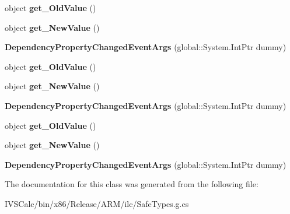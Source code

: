 \begin{DoxyCompactItemize}
object {\bfseries get\+\_\+\+Old\+Value} ()
\item 
\mbox{\label{class_windows_1_1_u_i_1_1_xaml_1_1_dependency_property_changed_event_args_a9f948d66a10d291f346697e57c1e5018}} 
object {\bfseries get\+\_\+\+New\+Value} ()
\item 
\mbox{\label{class_windows_1_1_u_i_1_1_xaml_1_1_dependency_property_changed_event_args_a74131a04ab6e85f2f133ed31ce9fb6b0}} 
{\bfseries Dependency\+Property\+Changed\+Event\+Args} (global\+::\+System.\+Int\+Ptr dummy)
\item 
\mbox{\label{class_windows_1_1_u_i_1_1_xaml_1_1_dependency_property_changed_event_args_ae4f18e2b5568671af10ff4232af56e6d}} 
object {\bfseries get\+\_\+\+Old\+Value} ()
\item 
\mbox{\label{class_windows_1_1_u_i_1_1_xaml_1_1_dependency_property_changed_event_args_a9f948d66a10d291f346697e57c1e5018}} 
object {\bfseries get\+\_\+\+New\+Value} ()
\item 
\mbox{\label{class_windows_1_1_u_i_1_1_xaml_1_1_dependency_property_changed_event_args_a74131a04ab6e85f2f133ed31ce9fb6b0}} 
{\bfseries Dependency\+Property\+Changed\+Event\+Args} (global\+::\+System.\+Int\+Ptr dummy)
\item 
\mbox{\label{class_windows_1_1_u_i_1_1_xaml_1_1_dependency_property_changed_event_args_ae4f18e2b5568671af10ff4232af56e6d}} 
object {\bfseries get\+\_\+\+Old\+Value} ()
\item 
\mbox{\label{class_windows_1_1_u_i_1_1_xaml_1_1_dependency_property_changed_event_args_a9f948d66a10d291f346697e57c1e5018}} 
object {\bfseries get\+\_\+\+New\+Value} ()
\item 
\mbox{\label{class_windows_1_1_u_i_1_1_xaml_1_1_dependency_property_changed_event_args_a74131a04ab6e85f2f133ed31ce9fb6b0}} 
{\bfseries Dependency\+Property\+Changed\+Event\+Args} (global\+::\+System.\+Int\+Ptr dummy)
\end{DoxyCompactItemize}


The documentation for this class was generated from the following file\+:\begin{DoxyCompactItemize}
\item 
I\+V\+S\+Calc/bin/x86/\+Release/\+A\+R\+M/ilc/Safe\+Types.\+g.\+cs\end{DoxyCompactItemize}
